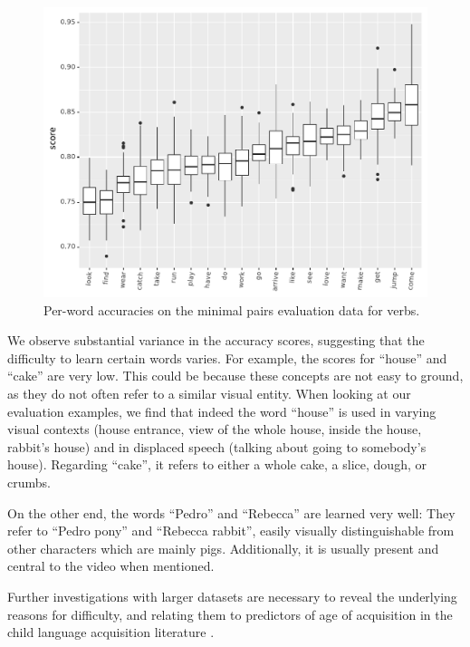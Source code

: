 \begin{figure}[htb]
  \centering
  \includegraphics[width=\linewidth]{results/targeted_triplets/results_per_word_version_335_VERB.pdf}
  \caption{Per-word accuracies on the minimal pairs evaluation data
    for verbs.}
  \label{fig:accuracy_targeted_triplets_verbs}
\end{figure}

We observe substantial variance in the accuracy scores, suggesting that the 
difficulty to learn certain words varies. For example, the 
scores for ``house'' and ``cake'' are very low. This could be because these 
concepts are not easy to ground, as they do not often refer to a similar visual 
entity. When looking at our evaluation examples, we find that indeed the word 
``house'' is used in varying visual contexts (house entrance, view of the whole 
house, inside the house, rabbit's house) and in displaced speech (talking about 
going to somebody's house). Regarding ``cake'', it refers to either a whole 
cake, a slice, dough, or crumbs.

On the other end, the words ``Pedro'' and ``Rebecca'' are learned very well: 
They refer to ``Pedro pony'' and ``Rebecca rabbit'', easily visually 
distinguishable from other characters which are mainly pigs. Additionally, it 
is usually present and central to the video when mentioned.

Further investigations with larger datasets are necessary to reveal the 
underlying reasons for difficulty, and relating them to predictors of age of 
acquisition in the child language acquisition literature 
\cite{roy2015predicting,frank2021variability}. 


